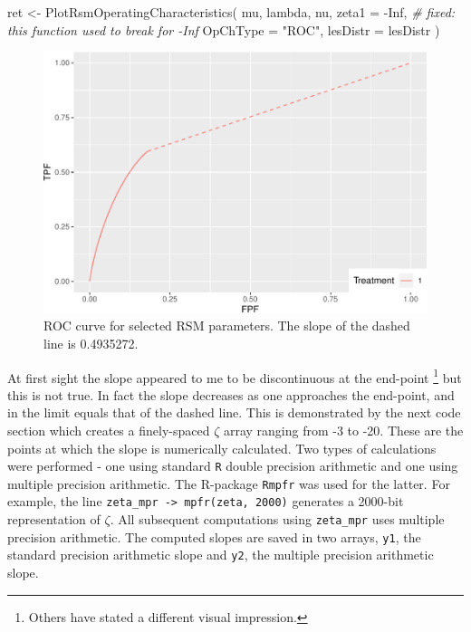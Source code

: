 \documentclass[
]{book}
\newenvironment{Shaded}{\begin{snugshade}}{\end{snugshade}}
\newcommand{\AttributeTok}[1]{\textcolor[rgb]{0.77,0.63,0.00}{#1}}
\newcommand{\CommentTok}[1]{\textcolor[rgb]{0.56,0.35,0.01}{\textit{#1}}}
\newcommand{\ConstantTok}[1]{\textcolor[rgb]{0.00,0.00,0.00}{#1}}
\newcommand{\FunctionTok}[1]{\textcolor[rgb]{0.00,0.00,0.00}{#1}}
\newcommand{\NormalTok}[1]{#1}
\newcommand{\OtherTok}[1]{\textcolor[rgb]{0.56,0.35,0.01}{#1}}
\newcommand{\SpecialCharTok}[1]{\textcolor[rgb]{0.00,0.00,0.00}{#1}}
\newcommand{\StringTok}[1]{\textcolor[rgb]{0.31,0.60,0.02}{#1}}
\begin{document}
\begin{Shaded}
\begin{Highlighting}[]
\NormalTok{ret }\OtherTok{\textless{}{-}} \FunctionTok{PlotRsmOperatingCharacteristics}\NormalTok{(}
\NormalTok{  mu,}
\NormalTok{  lambda,}
\NormalTok{  nu,}
  \AttributeTok{zeta1 =} \SpecialCharTok{{-}}\ConstantTok{Inf}\NormalTok{, }\CommentTok{\# fixed: this function used to break for {-}Inf}
  \AttributeTok{OpChType =} \StringTok{"ROC"}\NormalTok{,}
  \AttributeTok{lesDistr =}\NormalTok{ lesDistr}
\NormalTok{)}
\end{Highlighting}
\end{Shaded}

\begin{figure}
\centering
\includegraphics{17a-rsm-predictions_files/figure-latex/rsm-pred-roc-plot-1.pdf}
\caption{\label{fig:rsm-pred-roc-plot}ROC curve for selected RSM parameters. The slope of the dashed line is 0.4935272.}
\end{figure}

At first sight the slope appeared to me to be discontinuous at the end-point \footnote{Others have stated a different visual impression.} but this is not true. In fact the slope decreases as one approaches the end-point, and in the limit equals that of the dashed line. This is demonstrated by the next code section which creates a finely-spaced \(\zeta\) array ranging from -3 to -20. These are the points at which the slope is numerically calculated. Two types of calculations were performed - one using standard \texttt{R} double precision arithmetic and one using multiple precision arithmetic. The R-package \texttt{Rmpfr} was used for the latter. For example, the line \texttt{zeta\_mpr\ -\textgreater{}\ mpfr(zeta,\ 2000)} generates a 2000-bit representation of \(\zeta\). All subsequent computations using \texttt{zeta\_mpr} uses multiple precision arithmetic. The computed slopes are saved in two arrays, \texttt{y1}, the standard precision arithmetic slope and \texttt{y2}, the multiple precision arithmetic slope.
\end{document}

